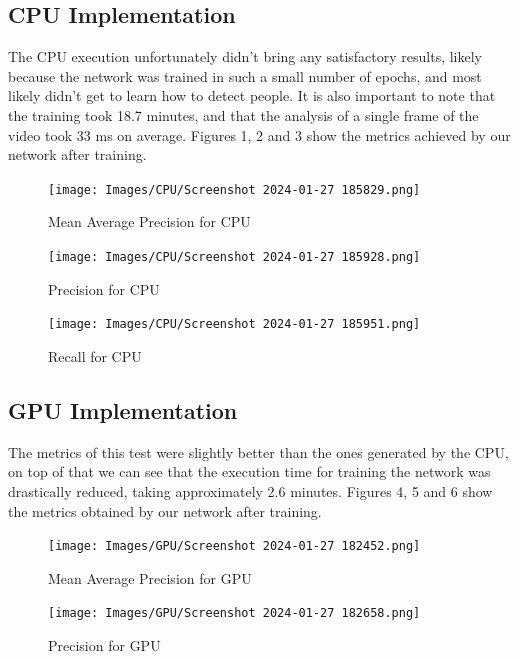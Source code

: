 \documentclass[conference]{IEEEtran}
\begin{document}
\subsection{CPU Implementation}
The CPU execution unfortunately didn't bring any satisfactory results, likely because the network was trained in such a small number of epochs, and most likely didn't get to learn how to detect people. It is also important to note that the training took 18.7 minutes, and that the analysis of a single frame of the video took 33 ms on average. Figures 1, 2 and 3 show the metrics achieved by our network after training.

\begin{figure}[ht!]
    \centering
    \texttt{[image: Images/CPU/Screenshot 2024-01-27 185829.png]}
    \caption{Mean Average Precision for CPU}\label{fig:CPUmAP}
\end{figure}

\begin{figure}[ht!]
    \centering
    \texttt{[image: Images/CPU/Screenshot 2024-01-27 185928.png]}
    \caption{Precision for CPU}\label{fig:CPUprecision}
\end{figure}

\begin{figure}[ht!]
    \centering
    \texttt{[image: Images/CPU/Screenshot 2024-01-27 185951.png]}
    \caption{Recall for CPU}\label{fig:CPUrecall}
\end{figure}

\subsection{GPU Implementation}
The metrics of this test were slightly better than the ones generated by the CPU, on top of that we can see that the execution time for training the network was drastically reduced, taking approximately 2.6 minutes. Figures 4, 5 and 6 show the metrics obtained by our network after training.
\begin{figure}[ht!]
    \centering
    \texttt{[image: Images/GPU/Screenshot 2024-01-27 182452.png]}
    \caption{Mean Average Precision for GPU}\label{fig:GPUmAP}
\end{figure}

\begin{figure}[ht!]
    \centering
    \texttt{[image: Images/GPU/Screenshot 2024-01-27 182658.png]}
    \caption{Precision for GPU}\label{fig:GPUprecision}
\end{figure}
\end{document}
